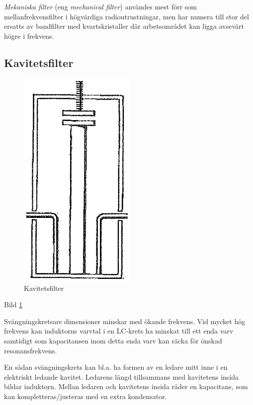 \emph{Mekaniska filter} (eng \emph{mechanical filter}) användes mest förr som
mellanfrekvensfilter i högvärdiga radioutrustningar, men har numera till stor
del ersatts av bandfilter med kvartskristaller där arbetsområdet kan ligga
avsevärt högre i frekvens.

\subsection{Kavitetsfilter}

\begin{figure}
\includegraphics[width=0.5\textwidth]{images/bild_2_3-31.png}
\caption{Kavitetsfilter}
\label{fig:BildII3-31}
\end{figure}

Bild \ref{fig:BildII3-31}

Svängningskretsars dimensioner minskar med ökande frekvens. Vid mycket hög
frekvens kan induktorns varvtal i en LC-krets ha minskat till ett enda varv
samtidigt som kapacitansen inom detta enda varv kan räcka för önskad
resonansfrekvens.

En sådan svängningskrets kan bl.a. ha formen av en ledare mitt inne i en
elektriskt ledande kavitet. Ledarens längd tillsammans med kavitetens insida
bildar induktorn. Mellan ledaren och kavitetens insida råder en kapacitans,
som kan kompletteras/justeras med en extra kondensator.

